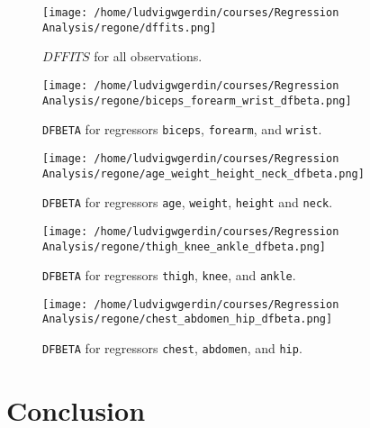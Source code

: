 \documentclass[11pt]{article}
\begin{document}
\begin{figure}[h]
\centering
\texttt{[image: /home/ludvigwgerdin/courses/Regression Analysis/regone/dffits.png]}
\caption{\label{fig:org03462b1}
\(DFFITS\) for all observations.}
\end{figure}

\begin{figure}[h]
\centering
\texttt{[image: /home/ludvigwgerdin/courses/Regression Analysis/regone/biceps\_forearm\_wrist\_dfbeta.png]}
\caption{\label{fig:org63697ee}
\texttt{DFBETA} for regressors \texttt{biceps}, \texttt{forearm}, and \texttt{wrist}.}
\end{figure}

\begin{figure}[h]
\centering
\texttt{[image: /home/ludvigwgerdin/courses/Regression Analysis/regone/age\_weight\_height\_neck\_dfbeta.png]}
\caption{\label{fig:orgc67d0c1}
\texttt{DFBETA} for regressors \texttt{age}, \texttt{weight}, \texttt{height} and \texttt{neck}.}
\end{figure}

\begin{figure}[h]
\centering
\texttt{[image: /home/ludvigwgerdin/courses/Regression Analysis/regone/thigh\_knee\_ankle\_dfbeta.png]}
\caption{\label{fig:orgc885024}
\texttt{DFBETA} for regressors \texttt{thigh}, \texttt{knee}, and \texttt{ankle}.}
\end{figure}

\begin{figure}[h]
\centering
\texttt{[image: /home/ludvigwgerdin/courses/Regression Analysis/regone/chest\_abdomen\_hip\_dfbeta.png]}
\caption{\label{fig:orgad3299c}
\texttt{DFBETA} for regressors \texttt{chest}, \texttt{abdomen}, and \texttt{hip}.}
\end{figure}

\section{Conclusion}
\label{sec:orgdb8685b}


\end{document}
